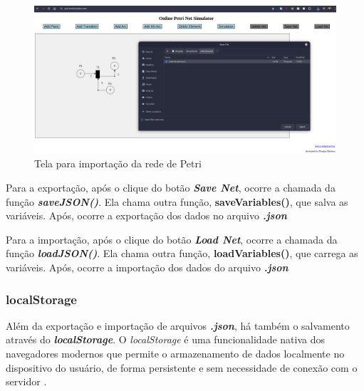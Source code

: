 \documentclass[
	12pt,				%
	openright,			%
	oneside,			%
	a4paper,			%
	english,			%
	brazil				%
	]{abntex2}
\begin{document}
\begin{figure}[ht] 
	\centering
	\includegraphics[scale=0.3]{figuras/loadNet.png}
	\caption[Tela para importação da rede de Petri]{Tela para importação da rede de Petri}
	\label{fig:loadNet}
\end{figure}
\FloatBarrier

Para a exportação, após o clique do botão \textbf{\textit{Save Net}}, ocorre a chamada da função \textbf{\textit{saveJSON()}}. Ela chama outra função, \textbf{saveVariables()}, que salva as variáveis. Após, ocorre a exportação dos dados no arquivo \textbf{\textit{.json}} 



Para a importação, após o clique do botão \textbf{\textit{Load Net}}, ocorre a chamada da função \textbf{\textit{loadJSON()}}. Ela chama outra função, \textbf{loadVariables()}, que carrega as variáveis. Após, ocorre a importação dos dados do arquivo \textbf{\textit{.json}} 



\subsubsection*{localStorage}\label{cap:localStorage} 

Além da exportação e importação de arquivos \textbf{\textit{.json}}, há também o salvamento através do \textbf{\textit{localStorage}}. O \textit{localStorage} é uma funcionalidade nativa dos navegadores modernos que permite o armazenamento de dados localmente no dispositivo do usuário, de forma persistente e sem necessidade de conexão com o servidor \cite{mdn_local_storage}. 
\end{document}

